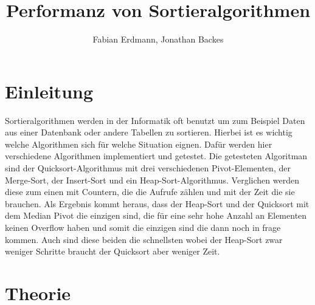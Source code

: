 \documentclass[12pt,a4paper]{article}
\author{Fabian Erdmann, Jonathan Backes}
\title{Performanz von Sortieralgorithmen}
\begin{document}
\maketitle
\tableofcontents
\newpage
\section{Einleitung}
Sortieralgorithmen werden in der Informatik oft benutzt um zum Beispiel Daten aus einer Datenbank oder andere Tabellen zu sortieren. Hierbei ist es wichtig welche Algorithmen sich für welche Situation eignen. Dafür werden hier verschiedene Algorithmen implementiert und getestet. Die getesteten Algoritman sind der Quicksort-Algorithmus mit drei verschiedenen Pivot-Elementen, der Merge-Sort, der Insert-Sort und ein Heap-Sort-Algorithmus. Verglichen werden diese zum einen mit Countern, die die Aufrufe zählen und mit der Zeit die sie brauchen. Als Ergebnis kommt heraus, dass der Heap-Sort und der Quicksort mit dem Median Pivot die einzigen sind, die für eine sehr hohe Anzahl an Elementen keinen Overflow haben und somit die einzigen sind die dann noch in frage kommen. Auch sind diese beiden die schnellsten wobei der Heap-Sort zwar weniger Schritte braucht der Quicksort aber weniger Zeit.
\section{Theorie}
\end{document}
